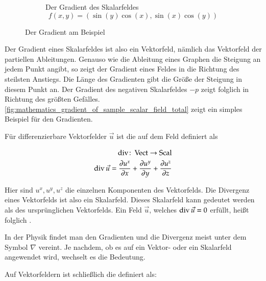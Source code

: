 \begin{figure}[ht]
\begin{subfigure}[t]{0.5\textwidth}
		\caption{Der Gradient des Skalarfeldes \[ f(x,y)=(\sin(y)\cos(x),\sin(x)\cos(y)) \]}
		\label{fig:mathematics_gradient_of_sample_scalar_field}
	\end{subfigure}
	\caption{Der Gradient am Beispiel}
	\label{fig:mathematics_gradient_of_sample_scalar_field_total}
\end{figure}

Der Gradient eines Skalarfeldes ist also ein Vektorfeld, nämlich das
Vektorfeld der partiellen Ableitungen. Genauso wie die Ableitung eines
Graphen die Steigung an jedem Punkt angibt, so zeigt der Gradient
eines Feldes in die Richtung des steilsten Anstiegs. Die Länge des
Gradienten gibt die Größe der Steigung in diesem Punkt an. Der
Gradient des negativen Skalarfeldes $-p$ zeigt folglich in Richtung
des größten Gefälles.
\autoref{fig:mathematics_gradient_of_sample_scalar_field_total} zeigt
ein simples Beispiel für den Gradienten.

Für differenzierbare Vektorfelder $\vec{u}$ ist die
 auf dem Feld definiert als

\begin{equation}
\begin{aligned}
\operatorname*{div} \colon \operatorname*{Vect} \to \operatorname*{Scal} \\
\operatorname*{div} \vec{u}
=
\frac{\partial u^x}{\partial x} +
\frac{\partial u^y}{\partial y} +
\frac{\partial u^z}{\partial z}
\end{aligned}
\end{equation}

Hier sind $u^x,u^y,u^z$ die einzelnen Komponenten des Vektorfelds. Die
Divergenz eines Vektorfelds ist also ein Skalarfeld. Dieses Skalarfeld kann
gedeutet werden als  des ursprünglichen
Vektorfelds. Ein Feld
$\vec{u}$, welches $\operatorname*{div} \vec{u}=0$ erfüllt, heißt folglich
.

In der Physik findet man den Gradienten und die Divergenz meist unter dem Symbol
$\nabla$ vereint. Je nachdem, ob es auf ein Vektor- oder ein Skalarfeld
angewendet wird, wechselt es die Bedeutung.

Auf Vektorfeldern ist schließlich die 
definiert als:

